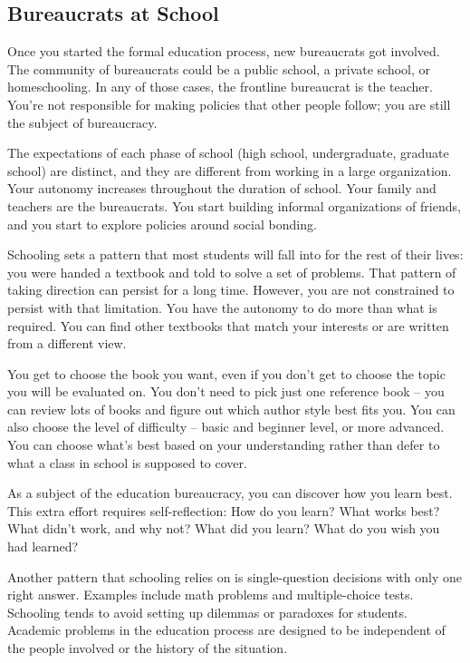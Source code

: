 \subsection*{Bureaucrats at School\label{sec:bureaucracy-of-school}}
Once you started the formal education process, new bureaucrats got involved.  The community of bureaucrats could be a public school, a private school, or homeschooling. In any of those cases, the frontline bureaucrat is the teacher. You're not responsible for making policies that other people follow; you are still the subject of bureaucracy.


The expectations of each phase of school (high school, undergraduate, graduate school) are distinct, and they are different from working in a large organization. Your autonomy increases throughout the duration of school. %
Your family and teachers are the bureaucrats. You start building informal organizations of friends, and you start to explore policies around social bonding.

Schooling sets a pattern that most students will fall into for the rest of their lives: you were handed a textbook and told to solve a set of problems. That pattern of taking direction can persist for a long time. However, you are not constrained to persist with that limitation. You have the autonomy to do more than what is required. You can find other textbooks that match your interests or are written from a different view. 

You get to choose the book you want, even if you don't get to choose the topic you will be evaluated on. You don't  need to pick just one reference book -- you can review lots of books and figure out which author style best fits you. You can also choose the level of difficulty -- basic and beginner level, or more advanced. You can choose what's best based on your understanding rather than defer to what a class in school is supposed to cover.

As a subject of the education bureaucracy, you can discover how you learn best. This extra effort requires self-reflection: How do you learn? What works best? What didn't work, and why not? What did you learn? What do you wish you had learned?

Another pattern that schooling relies on is single-question decisions with only one right answer. Examples include math problems and multiple-choice tests. Schooling tends to avoid setting up dilemmas or paradoxes for students. Academic problems in the education process are designed to be independent of the people involved or the history of the situation. 


